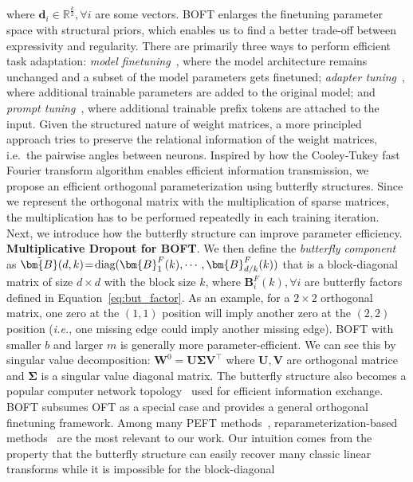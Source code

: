 \begin{theorem}
where $\bm{d}_i\in\mathbb{R}^{\frac{k}{2}},\forall i$ are some vectors. BOFT enlarges the finetuning parameter space with structural priors, which enables us to find a better trade-off between expressivity and regularity. There are primarily three ways to perform efficient task adaptation: \emph{model finetuning}~\cite{hulora2022,zaken2022bitfit,guo2020parameter,raffel2020exploring,qiu2023controlling,zhang2022adaptive,chavan2023one}, where the model architecture remains unchanged and a subset of the model parameters gets finetuned; \emph{adapter tuning}~\cite{rebuffi2017learning,houlsby2019parameter,pfeiffer2020adapterfusion,lin2020exploring,he2021towards}, where additional trainable parameters are added to the original model; and \emph{prompt tuning}~\cite{li2021prefix,lester2021power}, where additional trainable prefix tokens are attached to the input. Given the structured nature of weight matrices, a more principled approach  tries to preserve the relational information of the weight matrices, i.e.~the pairwise angles between neurons. Inspired by how the Cooley-Tukey fast Fourier transform algorithm enables efficient information transmission, we propose an efficient orthogonal parameterization using  butterfly structures. Since we represent the orthogonal matrix with the multiplication of sparse matrices, the multiplication has to be performed repeatedly in each training iteration. Next, we introduce how the butterfly structure can improve parameter efficiency. \textbf{Multiplicative Dropout for BOFT}. We then define the \emph{butterfly component} as $\thickmuskip=2mu \medmuskip=2mu \tilde{\bm{B}}(d,k)=\text{diag}(\bm{B}^F_1(k),\cdots,\bm{B}^F_{d/k}(k))$ that is a block-diagonal matrix of size $d\times d$ with the block size $k$, where $\bm{B}^F_i(k),\forall i$ are butterfly factors defined in Equation~\ref{eq:but_factor}. As an example, for a $2\times 2$ orthogonal matrix, one zero at the $(1,1)$ position will imply another zero at the $(2,2)$ position (\emph{i.e.}, one missing edge could imply another missing edge). BOFT with smaller $b$ and larger $m$ is generally more parameter-efficient. We can see this by singular value decomposition: $\bm{W}^0=\bm{U}\bm{\Sigma}\bm{V}^\top$ where $\bm{U},\bm{V}$ are orthogonal matrice and $\bm{\Sigma}$ is a singular value diagonal matrix. The butterfly structure also becomes a popular computer network topology~\cite{solihin2015fundamentals,li2011linear} used for efficient information exchange. BOFT subsumes OFT as a special case and provides a general orthogonal finetuning framework. Among many PEFT methods~\cite{houlsby2019parameter,aghajanyan2020intrinsic,hulora2022,edalati2022krona,wang2022adamix,gheini2021cross,zaken2022bitfit,guo2020parameter,sung2021training,ansell2022composable,lester2021power,li2021prefix,vu2022spot,he2021towards,mao2021unipelt,karimi2021compacter,liu2022few,sung2022lst,chen2022parameter,jia2022visual,chen2022adaptformer,zhang2022neural,jie2023fact,lian2022scaling,luo2023towards}, reparameterization-based methods~\cite{aghajanyan2020intrinsic,hulora2022,edalati2022krona} are the most relevant to our work. Our intuition comes from the property that the butterfly structure can easily recover many classic linear transforms while it is impossible for the block-diagonal 
\end{theorem}
